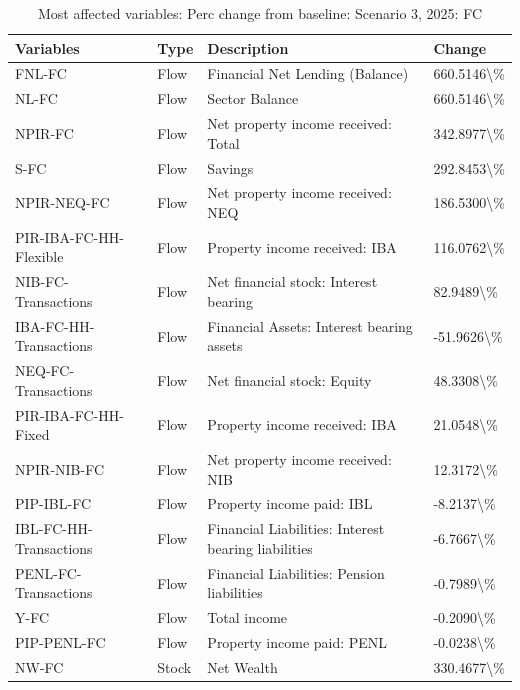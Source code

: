 \documentclass[
]{book}
\begin{document}
\begin{table}

\caption{\label{tab:most-affected-Scenario-3-perc-FC-2025}Most affected variables: Perc change from baseline: Scenario 3, 2025: FC}
\centering
\fontsize{10}{12}\selectfont
\begin{tabular}[t]{l|l|l|l}
\hline
Variables & Type & Description & Change\\
\hline
FNL-FC & Flow & Financial Net Lending (Balance) & 660.5146\textbackslash{}\%\\
\hline
NL-FC & Flow & Sector Balance & 660.5146\textbackslash{}\%\\
\hline
NPIR-FC & Flow & Net property income received: Total & 342.8977\textbackslash{}\%\\
\hline
S-FC & Flow & Savings & 292.8453\textbackslash{}\%\\
\hline
NPIR-NEQ-FC & Flow & Net property income received: NEQ & 186.5300\textbackslash{}\%\\
\hline
PIR-IBA-FC-HH-Flexible & Flow & Property income received: IBA & 116.0762\textbackslash{}\%\\
\hline
NIB-FC-Transactions & Flow & Net financial stock: Interest bearing & 82.9489\textbackslash{}\%\\
\hline
IBA-FC-HH-Transactions & Flow & Financial Assets: Interest bearing assets & -51.9626\textbackslash{}\%\\
\hline
NEQ-FC-Transactions & Flow & Net financial stock: Equity & 48.3308\textbackslash{}\%\\
\hline
PIR-IBA-FC-HH-Fixed & Flow & Property income received: IBA & 21.0548\textbackslash{}\%\\
\hline
NPIR-NIB-FC & Flow & Net property income received: NIB & 12.3172\textbackslash{}\%\\
\hline
PIP-IBL-FC & Flow & Property income paid: IBL & -8.2137\textbackslash{}\%\\
\hline
IBL-FC-HH-Transactions & Flow & Financial Liabilities: Interest bearing liabilities & -6.7667\textbackslash{}\%\\
\hline
PENL-FC-Transactions & Flow & Financial Liabilities: Pension liabilities & -0.7989\textbackslash{}\%\\
\hline
Y-FC & Flow & Total income & -0.2090\textbackslash{}\%\\
\hline
PIP-PENL-FC & Flow & Property income paid: PENL & -0.0238\textbackslash{}\%\\
\hline
NW-FC & Stock & Net Wealth & 330.4677\textbackslash{}\%\\

\end{tabular}
\end{table}
\end{document}
